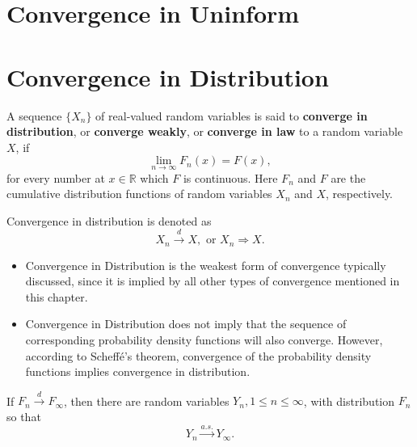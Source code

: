 \section{Convergence in Uninform}

\begin{definition}

\end{definition}

\section{Convergence in Distribution}

\begin{definition} \label{def:convergence-in-distribution}
    A sequence $\{X_n\}$ of real-valued random variables is said to \textbf{converge in distribution}, or \textbf{converge weakly}, or \textbf{converge in law} to a random variable $X$, if
    \begin{equation}
        \lim_{n\to\infty}F_n(x)=F(x),
    \end{equation}
    for every number at $x\in\mathbb{R}$ which $F$ is continuous. Here $F_n$ and $F$ are the cumulative distribution functions of random variables $X_n$ and $X$, respectively.

    Convergence in distribution is denoted as
    \begin{equation}
        X_n \stackrel{d}{\rightarrow} X, \text{ or } X_n \Rightarrow X.
    \end{equation}
\end{definition}

\begin{remark}
    \begin{itemize}
        \item Convergence in Distribution is the weakest form of convergence typically discussed, since it is implied by all other types of convergence mentioned in this chapter.
        \item Convergence in Distribution does not imply that the sequence of corresponding probability density functions will also converge. However, according to Scheff\'e's theorem, convergence of the probability density functions implies convergence in distribution.
    \end{itemize}
\end{remark}

\begin{lemma} \label{lem:distribution-to-probability}
    If $F_n\stackrel{d}{\rightarrow}F_\infty$, then there are random variables $Y_n,1\leq n\leq \infty$, with distribution $F_n$ so that
    \begin{equation}
        Y_n\stackrel{a.s.}{\rightarrow}Y_\infty.
    \end{equation}
\end{lemma}

